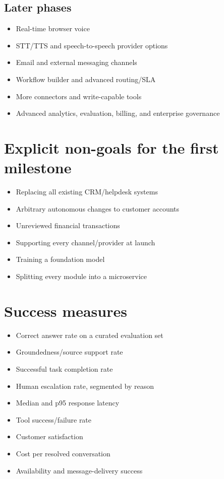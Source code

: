 \subsection{Later phases}

\begin{itemize}
\item Real-time browser voice
\item STT/TTS and speech-to-speech provider options
\item Email and external messaging channels
\item Workflow builder and advanced routing/SLA
\item More connectors and write-capable tools
\item Advanced analytics, evaluation, billing, and enterprise governance
\end{itemize}
\section{Explicit non-goals for the first milestone}

\begin{itemize}
\item Replacing all existing CRM/helpdesk systems
\item Arbitrary autonomous changes to customer accounts
\item Unreviewed financial transactions
\item Supporting every channel/provider at launch
\item Training a foundation model
\item Splitting every module into a microservice
\end{itemize}
\section{Success measures}

\begin{itemize}
\item Correct answer rate on a curated evaluation set
\item Groundedness/source support rate
\item Successful task completion rate
\item Human escalation rate, segmented by reason
\item Median and p95 response latency
\item Tool success/failure rate
\item Customer satisfaction
\item Cost per resolved conversation
\item Availability and message-delivery success
\end{itemize}





